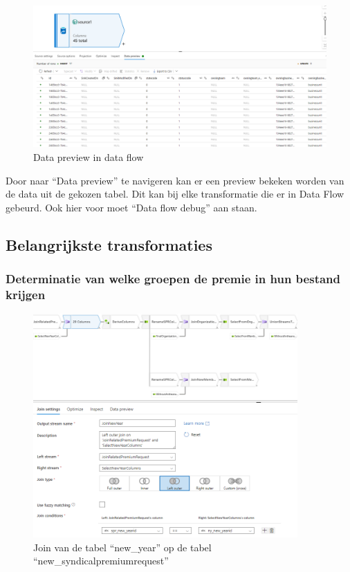 \begin{figure}[H]
    \centering
    \includegraphics[width=1\textwidth]{./graphics/adf/source_table_8_specific.png}
    \caption{Data preview in data flow}
    \label{fig:data-preview}
\end{figure}

Door naar ``Data preview'' te navigeren kan er een preview bekeken worden van de data uit de gekozen tabel. Dit kan bij elke transformatie die er in Data Flow gebeurd. Ook hier voor moet ``Data flow debug'' aan staan.

\pagebreak 

\subsection{Belangrijkste transformaties}

\subsubsection{Determinatie van welke groepen de premie in hun bestand krijgen}

\begin{figure}[H]
    \centering
    \includegraphics[width=0.9\textwidth]{./graphics/adf/bepalen_groep_1.png}
    \caption{Join van de tabel ``new\_year'' op de tabel ``new\_syndicalpremiumrequest''}
\end{figure}

